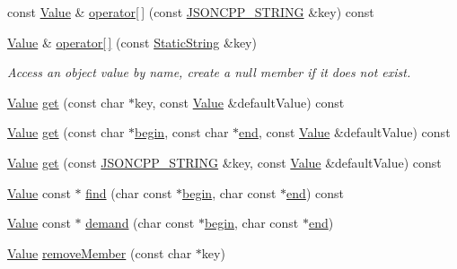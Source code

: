 \begin{DoxyCompactItemize}
\item 
const \hyperlink{class_json_1_1_value}{Value} \& \hyperlink{class_json_1_1_value_aba60f69dcd85e935aa85e7a517e03427}{operator\mbox{[}$\,$\mbox{]}} (const \hyperlink{json_8h_a1e723f95759de062585bc4a8fd3fa4be}{J\+S\+O\+N\+C\+P\+P\+\_\+\+S\+T\+R\+I\+NG} \&key) const
\item 
\hyperlink{class_json_1_1_value}{Value} \& \hyperlink{class_json_1_1_value_ac3763d7d315ca65dc188e273722f7955}{operator\mbox{[}$\,$\mbox{]}} (const \hyperlink{class_json_1_1_static_string}{Static\+String} \&key)
\begin{DoxyCompactList}\small\item\em Access an object value by name, create a null member if it does not exist. \end{DoxyCompactList}\item 
\hyperlink{class_json_1_1_value}{Value} \hyperlink{class_json_1_1_value_a57de86629ed23246f14014fb6c44fa67}{get} (const char $\ast$key, const \hyperlink{class_json_1_1_value}{Value} \&default\+Value) const
\item 
\hyperlink{class_json_1_1_value}{Value} \hyperlink{class_json_1_1_value_aa59ed050e87e1d58d93671a38687f36c}{get} (const char $\ast$\hyperlink{class_json_1_1_value_a015459a3950c198d63a2d3be8f5ae296}{begin}, const char $\ast$\hyperlink{class_json_1_1_value_a3e443cd0ef24f7e028b175e47ee045e0}{end}, const \hyperlink{class_json_1_1_value}{Value} \&default\+Value) const
\item 
\hyperlink{class_json_1_1_value}{Value} \hyperlink{class_json_1_1_value_a7406e6af727c288bf8ab59945ece686a}{get} (const \hyperlink{json_8h_a1e723f95759de062585bc4a8fd3fa4be}{J\+S\+O\+N\+C\+P\+P\+\_\+\+S\+T\+R\+I\+NG} \&key, const \hyperlink{class_json_1_1_value}{Value} \&default\+Value) const
\item 
\hyperlink{class_json_1_1_value}{Value} const  $\ast$ \hyperlink{class_json_1_1_value_afb007b9ce9b2cf9d5f667a07e5e0349f}{find} (char const $\ast$\hyperlink{class_json_1_1_value_a015459a3950c198d63a2d3be8f5ae296}{begin}, char const $\ast$\hyperlink{class_json_1_1_value_a3e443cd0ef24f7e028b175e47ee045e0}{end}) const
\item 
\hyperlink{class_json_1_1_value}{Value} const  $\ast$ \hyperlink{class_json_1_1_value_afeb7ff596a0929d90c5f2f3cffb413ed}{demand} (char const $\ast$\hyperlink{class_json_1_1_value_a015459a3950c198d63a2d3be8f5ae296}{begin}, char const $\ast$\hyperlink{class_json_1_1_value_a3e443cd0ef24f7e028b175e47ee045e0}{end})
\item 
\hyperlink{class_json_1_1_value}{Value} \hyperlink{class_json_1_1_value_aa52f7873b95d29627d6e83ba96f69aaa}{remove\+Member} (const char $\ast$key)

\end{DoxyCompactItemize}
